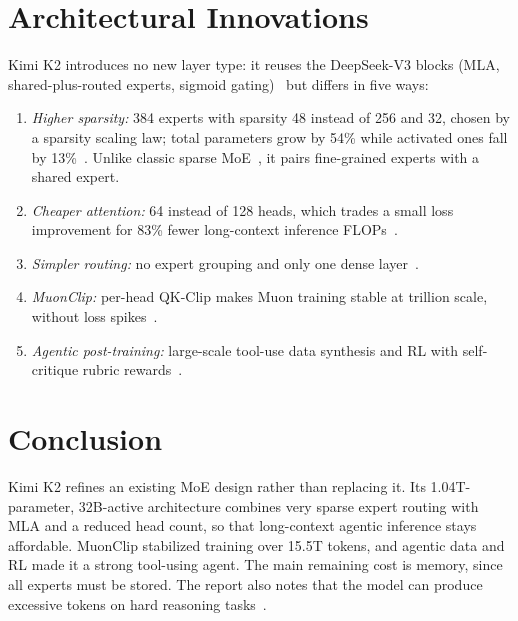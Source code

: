 \documentclass[conference]{IEEEtran}
\begin{document}
\section{Architectural Innovations}
Kimi K2 introduces no new layer type: it reuses the DeepSeek-V3 blocks (MLA, shared-plus-routed experts, sigmoid gating)~\cite{deepseekv3} but differs in five ways:
\begin{enumerate}
\item \emph{Higher sparsity:} 384 experts with sparsity 48 instead of 256 and 32, chosen by a sparsity scaling law; total parameters grow by 54\% while activated ones fall by 13\%~\cite{kimik2}. Unlike classic sparse MoE~\cite{shazeer2017}, it pairs fine-grained experts with a shared expert.
\item \emph{Cheaper attention:} 64 instead of 128 heads, which trades a small loss improvement for 83\% fewer long-context inference FLOPs~\cite{kimik2}.
\item \emph{Simpler routing:} no expert grouping and only one dense layer~\cite{kimik2}.
\item \emph{MuonClip:} per-head QK-Clip makes Muon training stable at trillion scale, without loss spikes~\cite{kimik2}.
\item \emph{Agentic post-training:} large-scale tool-use data synthesis and RL with self-critique rubric rewards~\cite{kimik2}.
\end{enumerate}

\section{Conclusion}
Kimi K2 refines an existing MoE design rather than replacing it. Its 1.04T-parameter, 32B-active architecture combines very sparse expert routing with MLA and a reduced head count, so that long-context agentic inference stays affordable. MuonClip stabilized training over 15.5T tokens, and agentic data and RL made it a strong tool-using agent. The main remaining cost is memory, since all experts must be stored. The report also notes that the model can produce excessive tokens on hard reasoning tasks~\cite{kimik2}.



\end{document}
